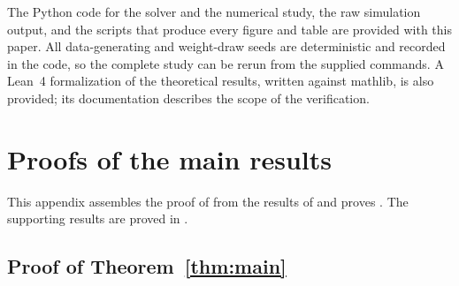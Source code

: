 \documentclass[11pt]{article}
\theoremstyle{definition}
\theoremstyle{remark}
\begin{document}
The Python code for the solver and the numerical study, the raw simulation
output, and the scripts that produce every figure and table are provided with
this paper.  All data-generating and weight-draw seeds are deterministic and
recorded in the code, so the complete study can be rerun from the supplied
commands.  A Lean~4 formalization of the theoretical results, written against
mathlib, is also provided; its documentation describes the scope of the
verification.


\appendix
{}

\section{Proofs of the main results}
\label{app:main-proofs}

This appendix assembles the proof of  from the results of
 and proves
.  The supporting results are proved in
.

\subsection{Proof of Theorem~\ref{thm:main}}\label{app:proof-main}
\end{document}
